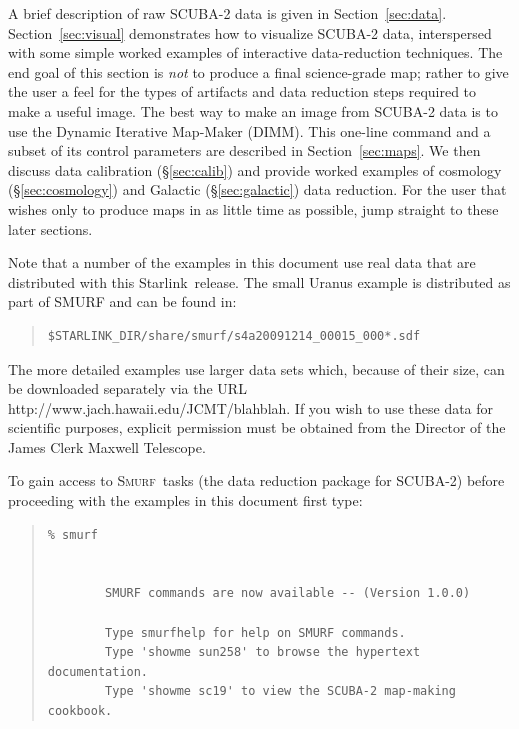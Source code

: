 \documentclass[twoside,11pt]{article}
\newcommand{\htmladdnormallink}[2]{#1}
\newcommand{\xref}[3]{#1}
\renewcommand{\_}{\texttt{\symbol{95}}}
\newenvironment{myquote}{\begin{quote}\begin{small}}{\end{small}\end{quote}}
\newcommand{\starlink}{\htmladdnormallink{Starlink}{http://starlink.jach.hawaii.edu}}
\newcommand{\smurf}{\xref{\textsc{Smurf}}{sun258}{}}
\begin{document}
A brief description of raw SCUBA-2 data is given in
Section~\ref{sec:data}. Section~\ref{sec:visual} demonstrates how to
visualize SCUBA-2 data, interspersed with some simple worked examples
of interactive data-reduction techniques. The end goal of this section
is {\em not} to produce a final science-grade map; rather to give the
user a feel for the types of artifacts and data reduction steps
required to make a useful image. The best way to make an image from
SCUBA-2 data is to use the Dynamic Iterative Map-Maker (DIMM). This
one-line command and a subset of its control parameters are described
in Section~\ref{sec:maps}. We then discuss data calibration
(\S\ref{sec:calib}) and provide worked examples of cosmology
(\S\ref{sec:cosmology}) and Galactic (\S\ref{sec:galactic}) data
reduction. For the user that wishes only to produce maps in as little
time as possible, jump straight to these later sections.

Note that a number of the examples in this document use real data that
are distributed with this \starlink\ release. The small Uranus example
is distributed as part of SMURF and can be found in:

\begin{myquote}
\begin{verbatim}
$STARLINK_DIR/share/smurf/s4a20091214_00015_000*.sdf
\end{verbatim}
\end{myquote}

The more detailed examples use larger data sets which, because of
their size, can be downloaded separately via the URL
\htmladdnormallink{http://www.jach.hawaii.edu/JCMT/blahblah}{http://www.jach.hawaii.edu/JCMT/blahblah}.
If you wish to use these data for scientific purposes, explicit
permission must be obtained from the Director of the James Clerk
Maxwell Telescope.

To gain access to \smurf\ tasks (the data reduction package for
SCUBA-2) before proceeding with the examples in this document first
type:

\begin{myquote}
\begin{verbatim}
% smurf


        SMURF commands are now available -- (Version 1.0.0)

        Type smurfhelp for help on SMURF commands.
        Type 'showme sun258' to browse the hypertext documentation.
        Type 'showme sc19' to view the SCUBA-2 map-making cookbook.

\end{verbatim}
\end{myquote}
%
\end{document}
